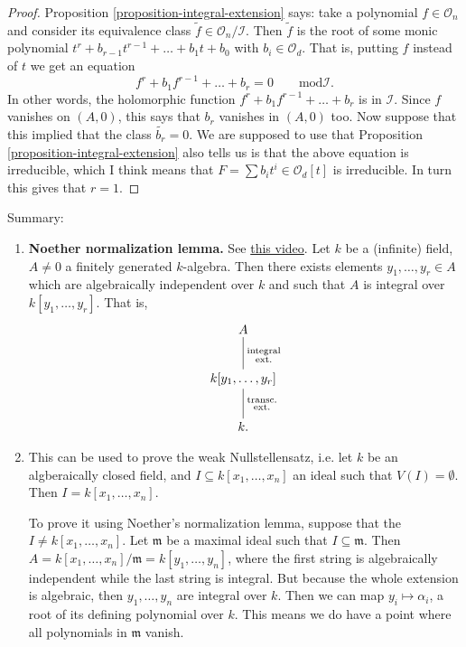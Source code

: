 \begin{proof}
Proposition
\ref{proposition-integral-extension}
says: take a polynomial $f \in \mathcal{O}_n$
and consider its equivalence class
$\tilde{f}\in\mathcal{O}_n/\mathcal{I}$.
Then $\tilde{f}$ is the root of some monic
polynomial
$t^r+b_{r-1}t^{r-1}+\ldots+b_1t+b_0$
with $b_i \in \mathcal{O}_d$.
That is, putting $f$ instead of $t$ we get an
equation
$$
f^r+b_1f^{r-1}+\ldots+b_r=0\qquad \text{mod
}\mathcal{I}.
$$
In other words, the holomorphic function
$f^r+b_1f^{r-1}+\ldots+b_r$ is in
$\mathcal{I}$.
Since $f$ vanishes on $(A,0)$,
this says that $b_r$ vanishes in $(A,0)$ too.
Now suppose that this implied that the class
$\tilde{b_r}=0$.
We are supposed to use that Proposition
\ref{proposition-integral-extension}
also tells us is that the above equation is
irreducible,
which I think means that $F=\sum b_it^i \in
\mathcal{O}_d[t]$
is irreducible.
In turn this gives that $r=1$.
\end{proof}


\medskip\noindent
Summary:
\begin{enumerate}
\item {\bf Noether normalization lemma.}
See
\href{https://www.youtube.com/watch?v=%
VWWoG_4XVvs}
{this video}.
Let $k$ be a (infinite) field,
$A \neq 0$ a finitely generated $k$-algebra.
Then there exists elements $y_1,\ldots,y_r
\in A$
which are algebraically independent over $k$
and such that $A$ is integral over
$k[y_1,\ldots,y_r]$.
That is,
$$
\xymatrix{
A\ar@{-}[d]^{\substack{\text{integral} \\
\text{ext.}}}\\
k[y_1,\ldots,y_r]\ar@{-}[d]
^{\substack{\text{transc.}
\\ \text{ext.}}}\\
k.
}
$$

\item This can be used to prove the weak
Nullstellensatz, i.e.
let $k$ be an algberaically closed field, and
$I \subseteq k[x_1,\ldots,x_n]$
an ideal such that $V(I)=\emptyset$. Then
$I=k[x_1,\ldots,x_n]$.

To prove it using Noether's normalization
lemma,
suppose that the $I\neq k[x_1,\ldots,x_n]$.
Let $\mathfrak{m}$ be a maximal ideal such
that $I \subseteq \mathfrak{m}$.
Then
$A=k[x_1,\ldots,x_n]/\mathfrak{m}=k[y_1,
\ldots,y_n]$,
where the first string is algebraically
independent
while the last string is integral. But
because the
whole extension is algebraic, then
$y_1,\ldots,y_n$
are integral over $k$.
Then we can map $y_i \mapsto \alpha_i$, a
root
of its defining polynomial over $k$.
This means we do have a point where all
polynomials
in $\mathfrak{m}$ vanish.
\end{enumerate}





